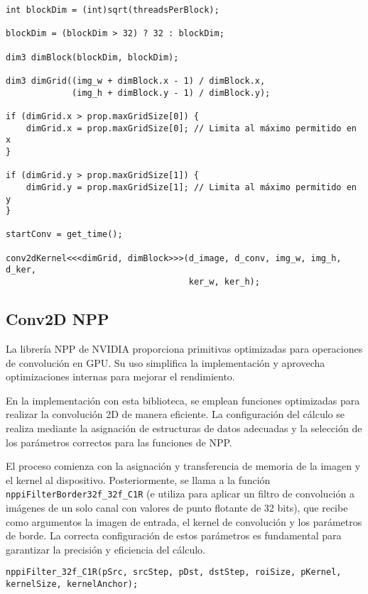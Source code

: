 \begin{lstlisting}
int blockDim = (int)sqrt(threadsPerBlock);

blockDim = (blockDim > 32) ? 32 : blockDim;

dim3 dimBlock(blockDim, blockDim);

dim3 dimGrid((img_w + dimBlock.x - 1) / dimBlock.x,
             (img_h + dimBlock.y - 1) / dimBlock.y);

if (dimGrid.x > prop.maxGridSize[0]) {
    dimGrid.x = prop.maxGridSize[0]; // Limita al máximo permitido en x
}

if (dimGrid.y > prop.maxGridSize[1]) {
    dimGrid.y = prop.maxGridSize[1]; // Limita al máximo permitido en y
}

startConv = get_time();

conv2dKernel<<<dimGrid, dimBlock>>>(d_image, d_conv, img_w, img_h, d_ker,
                                    ker_w, ker_h);
\end{lstlisting}


\subsection{Conv2D NPP}
La librería NPP de NVIDIA proporciona primitivas optimizadas para operaciones de convolución en GPU. Su uso simplifica la implementación y aprovecha optimizaciones internas para mejorar el rendimiento.

En la implementación con esta biblioteca, se emplean funciones optimizadas para realizar la convolución 2D de manera eficiente. La configuración del cálculo se realiza mediante la asignación de estructuras de datos adecuadas y la selección de los parámetros correctos para las funciones de NPP.

El proceso comienza con la asignación y transferencia de memoria de la imagen y el kernel al dispositivo. Posteriormente, se llama a la función \texttt{nppiFilterBorder32f\_32f\_C1R} (e utiliza para aplicar un filtro de convolución a imágenes de un solo canal con valores de punto flotante de 32 bits), que recibe como argumentos la imagen de entrada, el kernel de convolución y los parámetros de borde. La correcta configuración de estos parámetros es fundamental para garantizar la precisión y eficiencia del cálculo.

\begin{lstlisting}
nppiFilter_32f_C1R(pSrc, srcStep, pDst, dstStep, roiSize, pKernel, kernelSize, kernelAnchor);
\end{lstlisting}


